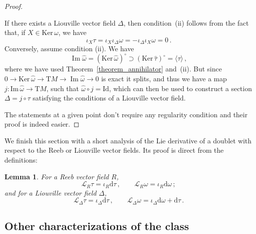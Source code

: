 \documentclass[11pt,twoside]{article}
\theoremstyle{plain}
\newtheorem{lemma}[theorem]{Lemma}
\theoremstyle{definition}
\renewcommand{\d}{\mathrm{d}}
\newcommand{\T}{{\mathrm T}}
\let\Tan\T
\newcommand{\Id}{\mathrm{Id}}
\newcommand*{\inn}[1]{\iota_{#1}}
\newcommand{\Lie}{\mathscr{L}}
\newcommand{\X}{\mathfrak{X}}
\DeclareMathOperator{\Ima}{Im}
\def\d{\mathrm{d}}
\def\X{\mathfrak{X}}
\def\d{\mathrm{d}}
\def\Im{\mathrm{Im \,}}
\def\Ker{\mathrm{Ker \,}}
\def\Tan{\mathrm{T}}
\def\Lie{\mathscr{L}}
\begin{document}
\begin{proof}
\begin{itemize}
If there exists a Liouville vector field $\Delta$, then condition~(ii) follows from the fact that, if $X\in \Ker \omega$, we have
$$\inn{X} \tau = \inn{X}\inn{\Delta} \omega = -\inn{\Delta}\inn{X}\omega =0\,.$$
Conversely, assume condition (ii). 
We have 
$$
\Ima \widehat\omega =
(\Ker \widehat\omega)^\circ \supset
(\Ker \widehat\tau)^\circ = 
\langle \tau \rangle
\,,
$$
where we have used Theorem~\ref{theorem_annihilator}
and~(ii).
But since
$0\to\Ker \widehat\omega \to 
\Tan M \to
\Ima \widehat\omega\to0$
is exact it splits, and thus we have a map $j\colon \Im \widehat \omega \to \T M$, such that $\widehat \omega\circ  j =\Id$, which can then be used to construct a section $\Delta = j\circ\tau$ satisfying the conditions of a Liouville vector field.
\end{itemize}
The statements at a given point don't require any regularity condition
and their proof is indeed easier.
\end{proof}




We finish this section with a short analysis of the Lie derivative of a doublet 
with respect to the Reeb or Liouville vector fields.
Its proof is direct from the definitions:
\begin{lemma}
For a Reeb vector field $R$,
$$
\Lie_R \tau = \inn{R} \d\tau \,, \qquad \Lie_{R} \omega = \inn{R} \d\omega\,;
$$
and for a Liouville vector field $\Delta$,
$$
\Lie_{\Delta} \tau = \inn{\Delta} \d \tau\,, \qquad \Lie_{\Delta} \omega  = \inn{\Delta} \d \omega + \d \tau\,.
$$
\end{lemma}

\subsection{Other characterizations of the class}
\end{document}
